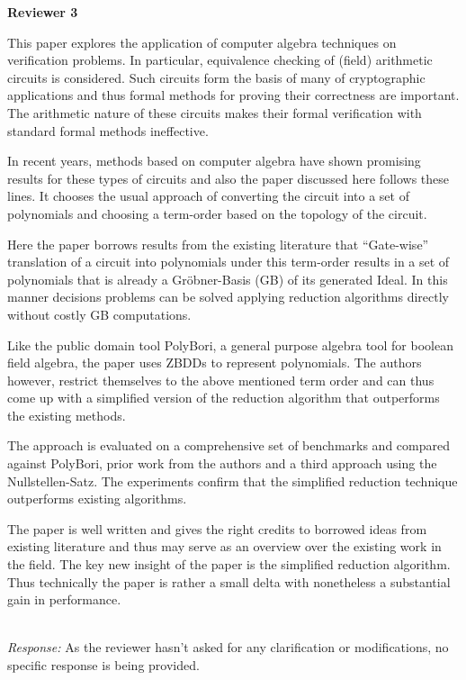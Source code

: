 \documentclass[conference, onecolumn]{IEEEtran}
\begin{document}
\begin{center}
{\bf \large Reviewer 3}
\end{center}  
\vspace{0.1in}
\par This paper explores the application of computer algebra techniques on verification problems. In particular, equivalence checking of (field) arithmetic circuits is considered. Such circuits form the basis of many of cryptographic applications and thus formal methods for proving their correctness are important. The arithmetic nature of these circuits makes their formal verification with standard formal methods ineffective.
\par In recent years, methods based on computer algebra have shown promising results for these types of circuits and also the paper discussed here follows these lines. It chooses the usual approach of converting the circuit into a set of polynomials and choosing a term-order based on the topology of the circuit.
\par Here the paper borrows results from the existing literature that “Gate-wise” translation of a circuit into polynomials under this term-order results in a set of polynomials that is already a Gröbner-Basis (GB) of its generated Ideal. In this manner decisions problems can be solved applying reduction algorithms directly without costly GB computations.
\par Like the public domain tool PolyBori, a general purpose algebra tool for boolean field algebra, the paper uses ZBDDs to represent polynomials. The authors however, restrict themselves to the above mentioned term order and can thus come up with a simplified version of the reduction algorithm that outperforms the existing methods.
\par The approach is evaluated on a comprehensive set of benchmarks and compared against PolyBori, prior work from the authors and a third approach using the Nullstellen-Satz. The experiments confirm that the simplified reduction technique outperforms existing algorithms.
\par The paper is well written and gives the right credits to borrowed ideas from existing literature and thus may serve as an overview over the existing work in the field. The key new insight of the paper is the simplified reduction algorithm. Thus technically the paper is rather a small delta with nonetheless a substantial gain in performance.

\ \\
{\it Response:} As the reviewer hasn't asked for any clarification or
modifications, no specific response is being provided. 
\end{document}
